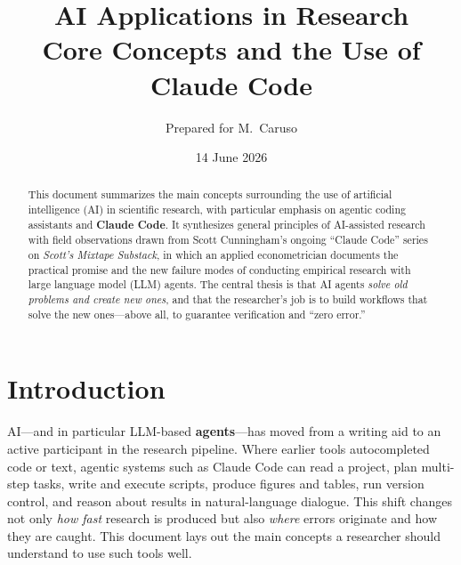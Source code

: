 \documentclass[11pt]{article}
\title{\textbf{AI Applications in Research}\\[0.3em]
\large Core Concepts and the Use of Claude Code}
\author{Prepared for M.\ Caruso}
\date{14 June 2026}
\newcommand{\concept}[1]{\textbf{#1}}
\begin{document}
\maketitle

\begin{abstract}
\noindent This document summarizes the main concepts surrounding the use of
artificial intelligence (AI) in scientific research, with particular emphasis
on agentic coding assistants and \concept{Claude Code}. It synthesizes general
principles of AI-assisted research with field observations drawn from Scott
Cunningham's ongoing ``Claude Code'' series on \emph{Scott's Mixtape Substack},
in which an applied econometrician documents the practical promise and the new
failure modes of conducting empirical research with large language model (LLM)
agents. The central thesis is that AI agents \emph{solve old problems and create
new ones}, and that the researcher's job is to build workflows that solve the
new ones---above all, to guarantee verification and ``zero error.''
\end{abstract}

\section{Introduction}
AI---and in particular LLM-based \concept{agents}---has moved from a writing aid
to an active participant in the research pipeline. Where earlier tools
autocompleted code or text, agentic systems such as Claude Code can read a
project, plan multi-step tasks, write and execute scripts, produce figures and
tables, run version control, and reason about results in natural-language
dialogue. This shift changes not only \emph{how fast} research is produced but
also \emph{where} errors originate and how they are caught. This document lays
out the main concepts a researcher should understand to use such tools well.
\end{document}
